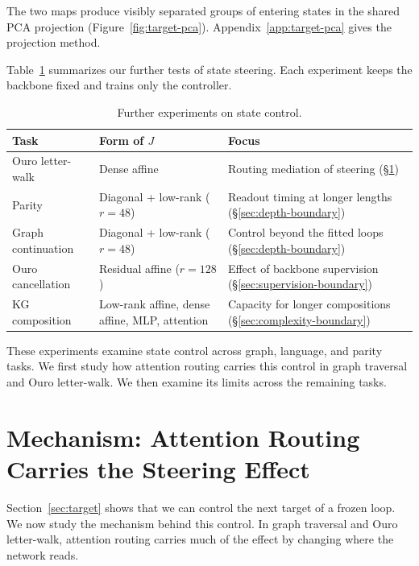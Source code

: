 \documentclass{article}
\begin{document}
The two maps produce visibly separated groups of entering states in the shared PCA projection (Figure~\ref{fig:target-pca}). Appendix~\ref{app:target-pca} gives the projection method.

Table~\ref{tab:steering-scope} summarizes our further tests of state steering. Each experiment keeps the backbone fixed and trains only the controller.

\begin{table}[!htbp]
\centering
\caption{Further experiments on state control.}
\label{tab:steering-scope}
\footnotesize
\setlength{\tabcolsep}{3pt}
\renewcommand{\arraystretch}{1.05}
\begin{tabular*}{\linewidth}{@{\extracolsep{\fill}}lll@{}}
\toprule
Task & Form of $J$ & Focus \\
\midrule
Ouro letter-walk & Dense affine & Routing mediation of steering (\S\ref{sec:hypothesis}) \\
Parity & Diagonal + low-rank ($r=48$) & Readout timing at longer lengths (\S\ref{sec:depth-boundary}) \\
Graph continuation & Diagonal + low-rank ($r=48$) & Control beyond the fitted loops (\S\ref{sec:depth-boundary}) \\
Ouro cancellation & Residual affine ($r=128$) & Effect of backbone supervision (\S\ref{sec:supervision-boundary}) \\
KG composition & Low-rank affine, dense affine, MLP, attention & Capacity for longer compositions (\S\ref{sec:complexity-boundary}) \\
\bottomrule
\end{tabular*}
\end{table}

These experiments examine state control across graph, language, and parity tasks. We first study how attention routing carries this control in graph traversal and Ouro letter-walk. We then examine its limits across the remaining tasks.

\section{Mechanism: Attention Routing Carries the Steering Effect}
\label{sec:hypothesis}\label{sec:large}
Section~\ref{sec:target} shows that we can control the next target of a frozen loop. We now study the mechanism behind this control. In graph traversal and Ouro letter-walk, attention routing carries much of the effect by changing where the network reads.
\end{document}
